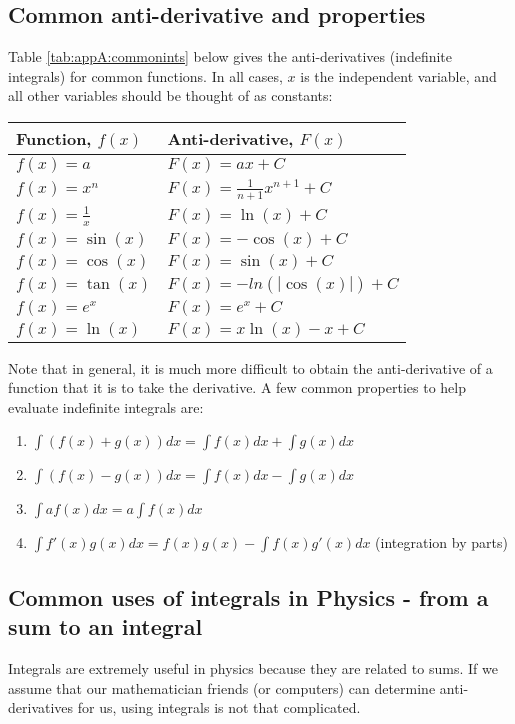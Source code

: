 \subsection{Common anti-derivative and properties}
Table \ref{tab:appA:commonints} below gives the anti-derivatives (indefinite integrals) for common functions. In all cases, $x$ is the independent variable, and all other variables should be thought of as constants:
\begin{center}
\begin{tabular}{l l}
\textbf{Function, $f(x)$} & \textbf{Anti-derivative, $F(x)$}\\
\hline\hline
$f(x)=a$ & $F(x)=ax+C$ \\
$f(x)=x^n$ & $F(x)=\frac{1}{n+1}x^{n+1}+C$ \\
$f(x)=\frac{1}{x}$ & $F(x)=\ln(x)+C$ \\
$f(x)=\sin(x)$ & $F(x)=-\cos(x)+C$ \\
$f(x)=\cos(x)$ & $F(x)=\sin(x)+C$ \\
$f(x)=\tan(x)$ & $F(x)=-ln(|\cos(x)|)+C$ \\
$f(x)=e^x$ & $F(x)=e^x+C$ \\
$f(x)=\ln(x)$ & $F(x)=x\ln(x)-x+C$ \\
\hline
\end{tabular}
\end{center}

Note that in general, it is much more difficult to obtain the anti-derivative of a function that it is to take the derivative. A few common properties to help evaluate indefinite integrals are:
\begin{enumerate}
\item $\int (f(x)+g(x)) dx=\int f(x)dx+\int g(x) dx$
\item $\int (f(x)-g(x)) dx=\int f(x)dx-\int g(x) dx$
\item $\int af(x) dx=a\int f(x)dx$
\item $\int f'(x)g(x) dx= f(x)g(x)-\int f(x)g'(x) dx$ (integration by parts)
\end{enumerate}

\subsection{Common uses of integrals in Physics - from a sum to an integral}
Integrals are extremely useful in physics because they are related to sums. If we assume that our mathematician friends (or computers) can determine anti-derivatives for us, using integrals is not that complicated. 

